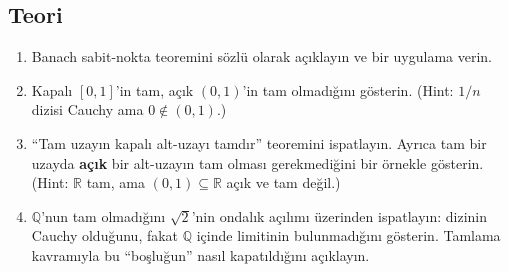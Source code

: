 \subsection*{Teori}

\begin{enumerate}[label=T\arabic*.]
\item Banach sabit-nokta teoremini sözlü olarak açıklayın ve bir uygulama verin.
\item Kapalı $[0,1]$'in tam, açık $(0,1)$'in tam olmadığını gösterin.
      (Hint: $1/n$ dizisi Cauchy ama $0 \notin (0,1)$.)
\item ``Tam uzayın kapalı alt-uzayı tamdır'' teoremini ispatlayın. Ayrıca tam bir
      uzayda \textbf{açık} bir alt-uzayın tam olması gerekmediğini bir örnekle
      gösterin. (Hint: $\mathbb{R}$ tam, ama $(0,1) \subseteq \mathbb{R}$ açık ve
      tam değil.)
\item $\mathbb{Q}$'nun tam olmadığını $\sqrt{2}$'nin ondalık açılımı üzerinden
      ispatlayın: dizinin Cauchy olduğunu, fakat $\mathbb{Q}$ içinde limitinin
      bulunmadığını gösterin. Tamlama kavramıyla bu ``boşluğun'' nasıl
      kapatıldığını açıklayın.
\end{enumerate}
